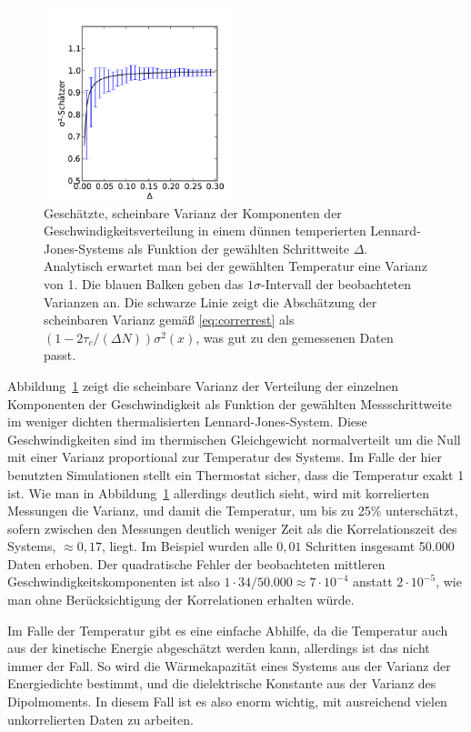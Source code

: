 \begin{figure}
  \centering
  \includegraphics[width=0.5\textwidth]{plots/error}
  \caption{Geschätzte, scheinbare Varianz der Komponenten der
    Geschwindigkeitsverteilung in einem dünnen temperierten
    Lennard-Jones-Systems als Funktion der gewählten Schrittweite
    $\Delta$. Analytisch erwartet man bei der gewählten Temperatur
    eine Varianz von 1. Die blauen Balken geben das
    $1\sigma$-Intervall der beobachteten Varianzen an. Die schwarze
    Linie zeigt die Abschätzung der scheinbaren Varianz gemäß
    \eqref{eq:correrrest} als $(1-2\tau_c/(\Delta N))\sigma^2(x)$, was
    gut zu den gemessenen Daten passt.}
  \label{fig:error}
\end{figure}

Abbildung~\ref{fig:error} zeigt die scheinbare Varianz der Verteilung
der einzelnen Komponenten der Geschwindigkeit als Funktion der
gewählten Messschrittweite im weniger dichten thermalisierten
Lennard-Jones-System. Diese Geschwindigkeiten sind im thermischen
Gleichgewicht normalverteilt um die Null mit einer Varianz
proportional zur Temperatur des Systems. Im Falle der hier benutzten
Simulationen stellt ein Thermostat sicher, dass die Temperatur exakt 1
ist. Wie man in Abbildung~\ref{fig:error} allerdings deutlich sieht,
wird mit korrelierten Messungen die Varianz, und damit die Temperatur,
um bis zu 25\% unterschätzt, sofern zwischen den Messungen deutlich
weniger Zeit als die Korrelationszeit des Systems, $\approx 0,17$,
liegt. Im Beispiel wurden alle $0,01$ Schritten insgesamt 50.000 Daten
erhoben. Der quadratische Fehler der beobachteten mittleren
Geschwindigkeitskomponenten ist also $1\cdot 34/50.000 \approx 7\cdot
10^{-4}$ anstatt $2\cdot 10^{-5}$, wie man ohne Berücksichtigung der
Korrelationen erhalten würde.

Im Falle der Temperatur gibt es eine einfache Abhilfe, da die
Temperatur auch aus der kinetische Energie abgeschätzt werden kann,
allerdings ist das nicht immer der Fall. So wird die Wärmekapazität
eines Systems aus der Varianz der Energiedichte bestimmt, und die
dielektrische Konstante aus der Varianz des Dipolmoments. In diesem
Fall ist es also enorm wichtig, mit ausreichend vielen unkorrelierten
Daten zu arbeiten.


